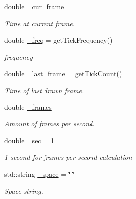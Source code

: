 \begin{DoxyCompactItemize}
\hypertarget{class_c_pong_a2e6d6b252154769a88b4be2741d715c8}{}\label{class_c_pong_a2e6d6b252154769a88b4be2741d715c8} 
double \hyperlink{class_c_pong_a2e6d6b252154769a88b4be2741d715c8}{\+\_\+cur\+\_\+frame}
\begin{DoxyCompactList}\small\item\em Time at current frame. \end{DoxyCompactList}\item 
\hypertarget{class_c_pong_a5c7b34f89f7eb7cfc903a31de167981e}{}\label{class_c_pong_a5c7b34f89f7eb7cfc903a31de167981e} 
double \hyperlink{class_c_pong_a5c7b34f89f7eb7cfc903a31de167981e}{\+\_\+freq} = get\+Tick\+Frequency()
\begin{DoxyCompactList}\small\item\em frequency \end{DoxyCompactList}\item 
\hypertarget{class_c_pong_a16104145e59837888b4e20bbadc25e95}{}\label{class_c_pong_a16104145e59837888b4e20bbadc25e95} 
double \hyperlink{class_c_pong_a16104145e59837888b4e20bbadc25e95}{\+\_\+last\+\_\+frame} = get\+Tick\+Count()
\begin{DoxyCompactList}\small\item\em Time of last drawn frame. \end{DoxyCompactList}\item 
\hypertarget{class_c_pong_a9920cd1de3bdf8ade274aded89ef687b}{}\label{class_c_pong_a9920cd1de3bdf8ade274aded89ef687b} 
double \hyperlink{class_c_pong_a9920cd1de3bdf8ade274aded89ef687b}{\+\_\+frames}
\begin{DoxyCompactList}\small\item\em Amount of frames per second. \end{DoxyCompactList}\item 
\hypertarget{class_c_pong_a5ee8cd3b286c3c31adb4f5d6e36fa3e8}{}\label{class_c_pong_a5ee8cd3b286c3c31adb4f5d6e36fa3e8} 
double \hyperlink{class_c_pong_a5ee8cd3b286c3c31adb4f5d6e36fa3e8}{\+\_\+sec} = 1
\begin{DoxyCompactList}\small\item\em 1 second for frames per second calculation \end{DoxyCompactList}\item 
\hypertarget{class_c_pong_ad4301539707dce40bf6fc9579827f602}{}\label{class_c_pong_ad4301539707dce40bf6fc9579827f602} 
std\+::string \hyperlink{class_c_pong_ad4301539707dce40bf6fc9579827f602}{\+\_\+space} = \char`\"{} \char`\"{}
\begin{DoxyCompactList}\small\item\em Space string. \end{DoxyCompactList}\item 

\end{DoxyCompactItemize}
